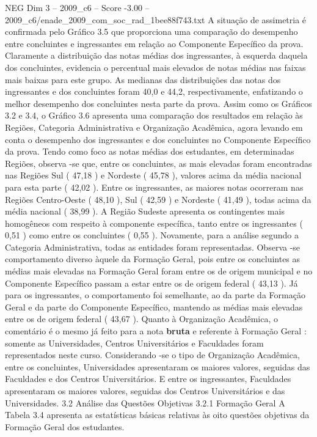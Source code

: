 \begin{textsample}{NEG Dim 3 – 2009\_c6 – Score -3.00 – 2009\_c6/enade\_2009\_com\_soc\_rad\_1bee88f743.txt}
A situação de assimetria é confirmada pelo Gráfico 3.5 que proporciona uma comparação do desempenho entre concluintes e ingressantes em relação ao Componente Específico da prova.
Claramente a distribuição das notas médias dos ingressantes, à esquerda daquela dos concluintes, evidencia o percentual mais elevados de notas médias nas faixas mais baixas para este grupo.
As medianas das distribuições das notas dos ingressantes e dos concluintes foram 40,0 e 44,2, respectivamente, enfatizando o melhor desempenho dos concluintes nesta parte da prova.
Assim como os Gráficos 3.2 e 3.4, o Gráfico 3.6 apresenta uma comparação dos resultados em relação às Regiões, Categoria Administrativa e Organização Acadêmica, agora levando em conta o desempenho dos ingressantes e dos concluintes no Componente Específico da prova.
Tendo como foco as notas médias dos estudantes, em determinadas Regiões, observa -se que, entre os concluintes, as mais elevadas foram encontradas nas Regiões Sul ( 47,18 ) e Nordeste ( 45,78 ), valores acima da média nacional para esta parte ( 42,02 ).
Entre os ingressantes, as maiores notas ocorreram nas Regiões Centro-Oeste ( 48,10 ), Sul ( 42,59 ) e Nordeste ( 41,49 ), todas acima da média nacional ( 38,99 ).
A Região Sudeste apresenta os contingentes mais homogêneos com respeito à componente específica, tanto entre os ingressantes ( 0,51 ) como entre os concluintes ( 0,55 ).
Novamente, para a análise segundo a Categoria Administrativa, todas as entidades foram representadas.
Observa -se comportamento diverso àquele da Formação Geral, pois entre os concluintes as médias mais elevadas na Formação Geral foram entre os de origem municipal e no Componente Específico passam a estar entre os de origem federal ( 43,13 ).
Já para os ingressantes, o comportamento foi semelhante, ao da parte da Formação Geral e da parte do Componente Específico, mantendo as médias mais elevadas entre os de origem federal ( 43,67 ).
Quanto à Organização Acadêmica, o comentário é o mesmo já feito para a nota \textbf{bruta} e referente à Formação Geral : somente as Universidades, Centros Universitários e Faculdades foram representados neste curso.
Considerando -se o tipo de Organização Acadêmica, entre os concluintes, Universidades apresentaram os maiores valores, seguidas das Faculdades e dos Centros Universitários.
E entre os ingressantes, Faculdades apresentaram os maiores valores, seguidas dos Centros Universitários e das Universidades. 3.2 Análise das Questões Objetivas 3.2.1 Formação Geral A Tabela 3.4 apresenta as estatísticas básicas relativas às oito questões objetivas da Formação Geral dos estudantes.

\end{textsample}
